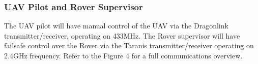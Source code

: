\subsubsection{UAV Pilot and Rover Supervisor}

The UAV pilot will have manual control of the UAV via the Dragonlink transmitter/receiver, operating on 433MHz. The Rover supervisor will have failsafe control over the Rover via the Taranis transmitter/receiver operating on 2.4GHz frequency. Refer to the Figure 4 for a full communications overview. 
\endinput